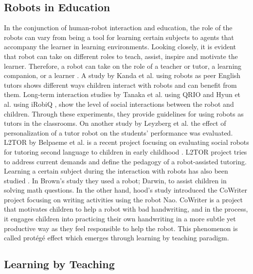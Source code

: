 \documentclass{sigchi}
\begin{document}
\subsection{Robots in Education}
In the conjunction of human-robot interaction and education, the role of the robots can vary from being a tool for learning certain subjects to agents that accompany the learner in learning environments. 
Looking closely, it is evident that robot can take on different roles to teach, assist, inspire and motivate the learner. 
Therefore, a robot can take on the role of a teacher or tutor, a learning companion, or a learner \cite{mubin2013review,leite2013social,hood2015children}. 
A study by Kanda et al. \cite{kanda2004interactive} using robots as peer English tutors shows different ways children interact with robots and can benefit from them. 
Long-term interaction studies by Tanaka et al. using QRIO \cite{tanaka2007socialization} and Hyun et al. using iRobiQ \cite{hyun2010relationships}, show the level of social interactions between the robot and children. 
Through these experiments, they provide guidelines for using robots as tutors in the classrooms.
On another study by Leyzberg et al. \cite{leyzberg2014personalizing} the effect of personalization of a tutor robot on the students' performance was evaluated. 
L2TOR by Belpaeme et al. \cite{belpaeme2015l2tor} is a recent project focusing on evaluating social robots for tutoring second language to children in early childhood .
L2TOR project tries to address current demands and define the pedagogy of a robot-assisted tutoring. 
Learning a certain subject during the interaction with robots has also been studied \cite{brown2013engaging,hood2015children}. 
In Brown's study \cite{brown2013engaging} they used a robot; Darwin, to assist children in solving math questions.
In the other hand, hood's study \cite{hood2015children, lemaignan2016learning} introduced the CoWriter project focusing on writing activities using the robot Nao.
CoWriter is a project that motivates children to help a robot with bad handwriting, and in the process, it engages children into practicing their own handwriting in a more subtle yet productive way as they feel responsible to help the robot. 
This phenomenon is called protégé effect which emerges through learning by teaching paradigm.  

\subsection{Learning by Teaching}
\end{document}

